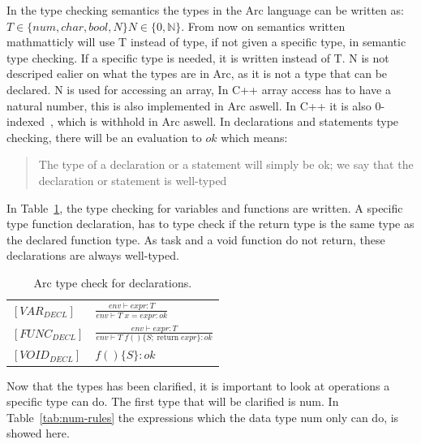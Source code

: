 In the type checking semantics the types in the Arc language can be written as:
$T \in \{num, char, bool, N\} N \in \{ 0,\mathbb{N}\}$.
From now on semantics written mathmatticly will use T instead of type, if not given a specific type, in semantic type checking. If a specific type is needed, it is written instead of T.
N is not descriped ealier on what the types are in Arc, as it is not a type that can be declared. N is used for accessing an array, In C++ array access has to have a natural number, this is also implemented in Arc aswell. In C++ it is also 0-indexed~\cite{cppreferenceDataTypes}, which is withhold in Arc aswell.
In declarations and statements type checking, there will be an evaluation to $ok$ which means:

\blockcquote{Huttel2010}{The type of a declaration or a statement will simply be ok; we say that the declaration or statement is well-typed}

In Table~\ref*{tab:DeclTypeCheck}, the type checking for variables and functions are written. A specific type function declaration, has to type check if the return type is the same type as the declared function type. As task and a void function do not return, these declarations are always well-typed.


\begin{table}[htb!]
    \centering
    \begin{tabular}{ll}
        \toprule
        $[VAR_{DECL}] $  & $\frac{env \vdash expr : T}{env \vdash T \;x = expr : ok}$                            \\  [12pt]
        $[FUNC_{DECL}] $ & $\frac{env \vdash expr : T}{env \vdash T \;f() \{S; \;\text{return} \; expr\}  : ok}$ \\  [12pt]
        $[VOID_{DECL}] $ & $f()\{S\}  : ok$                                                                      \\
        \bottomrule
    \end{tabular}
    \caption{Arc type check for declarations.}
    \label{tab:DeclTypeCheck}
\end{table}


Now that the types has been clarified, it is important to look at operations a specific type can do.
The first type that will be clarified is num.
In Table~\ref{tab:num-rules} the expressions which the data type num only can do, is showed here.


